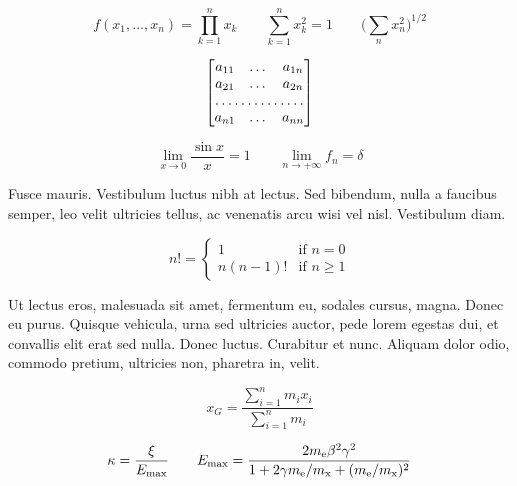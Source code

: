 \begin{equation}
f(x_1,\dots,x_n)=  \prod_{k=1}^n x_k
\qquad
\sum_{k=1}^n x_k^2=1
\qquad
\biggl(\sum_n x_n^2\biggr)^{1/2}
\end{equation}

\lipsum[2]

\begin{equation}
\begin{bmatrix}
a_{11} & \dots & a_{1n} \\
a_{21} & \dots & a_{2n} \\
\hdotsfor{3} \\
a_{n1} & \dots & a_{nn}
\end{bmatrix}
\end{equation}

\lipsum[4]

\begin{equation}
\lim_{x\to 0}
\frac{\sin x}{x}=1 \qquad
\lim_{n\to +\infty}f_n=\delta
\end{equation}

Fusce mauris. Vestibulum luctus nibh at lectus. Sed bibendum, nulla a faucibus semper, leo velit ultricies tellus, ac venenatis arcu wisi vel nisl. Vestibulum diam.

\begin{equation}
n!=
\begin{cases}
1       & \text{if $n=0$} \\
n(n-1)! & \text{if $n\ge 1$}
\end{cases}
\end{equation}

Ut lectus eros, malesuada sit amet, fermentum eu, sodales cursus, magna. Donec eu purus. Quisque vehicula, urna sed ultricies auctor, pede lorem egestas dui, et convallis elit erat sed nulla. Donec luctus. Curabitur et nunc. Aliquam dolor odio, commodo pretium, ultricies non, pharetra in, velit.

\begin{equation}
x_G=
\frac{\displaystyle
      \sum_{i=1}^n m_ix_i}
{\displaystyle\sum_{i=1}^n m_i}
\end{equation}

\lipsum[6]

\begin{equation}
\kappa =\frac{\xi}{E_{\textrm{max}}}
\qquad
E_{\textup{max}} =\frac{2 m_{\textup{e}} \beta^2\gamma^2 }{1 +2\gamma m_{\textup{e}}/m_{\textrm{x}} + ( m_{\textup{e}}/m_{\textup{x}})^2}
\end{equation}

\lipsum[8]
